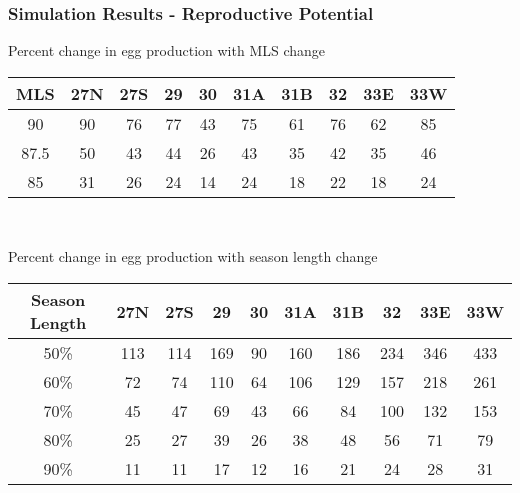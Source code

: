 \documentclass{beamer}
\begin{document}
\begin{frame}
\frametitle{Simulation Results - Reproductive Potential}
Percent change in egg production with MLS change 
\centering
\begin{tabular}{|c|c|c|c|c|c|c|c|c|c|}
\hline
MLS & 27N & 27S & 29 & 30 & 31A & 31B & 32 & 33E & 33W \\
\hline
90 & 90 & 76 & 77 & 43 & 75 & 61 & 76 & 62 & 85 \\
\hline
87.5 & 50 & 43 & 44 & 26 & 43 & 35 & 42 & 35 & 46 \\
\hline
85 & 31 & 26 & 24 & 14 & 24 & 18 & 22 & 18 & 24 \\
\hline
 
\end{tabular}\\

\vspace{5mm}

Percent change in egg production with season length change 
\centering
\begin{tabular}{|c|c|c|c|c|c|c|c|c|c|}
\hline
Season Length & 27N & 27S & 29 & 30 & 31A & 31B & 32 & 33E & 33W \\
\hline
50\% & 113 & 114 & 169 & 90 & 160 & 186 & 234 & 346 & 433 \\
\hline
60\% & 72  & 74  & 110 & 64 & 106 & 129 & 157 & 218 & 261 \\
\hline
70\% & 45  & 47  & 69  & 43 & 66  & 84  & 100 & 132 & 153 \\
\hline
80\% & 25  & 27  & 39  & 26 & 38  & 48  & 56  & 71  & 79  \\
\hline
90\% & 11  & 11  & 17  & 12 & 16  & 21  & 24  & 28  & 31  \\
\hline
 
\end{tabular}
\end{frame}
\end{document}
